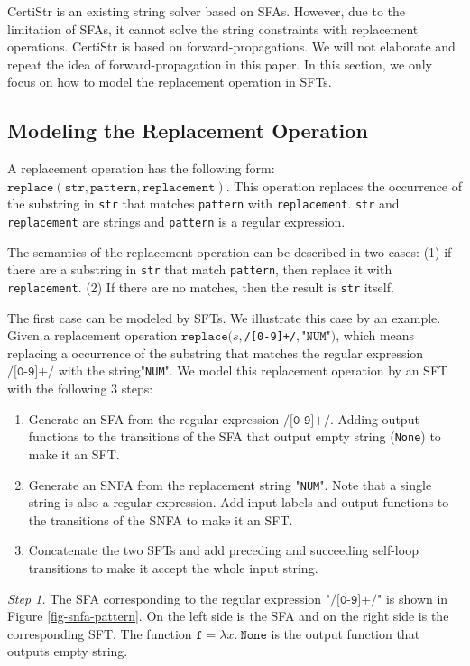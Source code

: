 \documentclass[a4paper,UKenglish,cleveref, autoref, thm-restate]{lipics-v2021}
\begin{document}
CertiStr is an existing string solver based on SFAs. However, due to the limitation of SFAs, it cannot solve the string constraints with replacement operations. CertiStr is based on forward-propagations. We will not elaborate and repeat the idea of forward-propagation in this paper. In this section, we only focus on how to model the replacement operation in SFTs.


\subsection{Modeling the Replacement Operation}


A replacement operation has the following form: $\texttt{replace}(\texttt{str}, \texttt{pattern}, \texttt{replacement})$. This operation replaces the occurrence of the substring in \texttt{str} that matches \texttt{pattern} with \texttt{replacement}. \texttt{str} and \texttt{replacement} are strings and \texttt{pattern} is a regular expression.

The semantics of the replacement operation can be described in two cases: (1) if there are a substring in \texttt{str} that match \texttt{pattern}, then replace it with \texttt{replacement}. (2) If there are no matches, then the result is \texttt{str} itself.

The first case can be modeled by SFTs. We illustrate this case by an example. Given a replacement operation $\texttt{replace}(s, $\texttt{/[0-9]+/}$, $"$\texttt{NUM}$"$)$, which means replacing a occurrence of the substring that matches the regular expression $\texttt{/[0-9]+/}$ with the string"\texttt{NUM}".
We model this replacement operation by an SFT with the following 3 steps:

\begin{enumerate}
  \item Generate an SFA from the regular expression $\texttt{/[0-9]+/}$. Adding output functions to the transitions of the SFA that output empty string (\texttt{None}) to make it an SFT.
  \item Generate an SNFA from the replacement string "\texttt{NUM}". Note that a single string is also a regular expression. Add input labels and output functions to the transitions of the SNFA to make it an SFT.
  \item Concatenate the two SFTs and add preceding and succeeding self-loop transitions to make it accept the whole input string.
\end{enumerate}


\noindent\emph{Step 1.}
The SFA corresponding to the regular expression "$\texttt{/[0-9]+/}$" is shown in Figure \ref{fig-snfa-pattern}. On the left side is the SFA and on the right side is the corresponding SFT. The function $\texttt{f} = \lambda x.~\texttt{None}$ is the output function that outputs empty string. 
\end{document}
